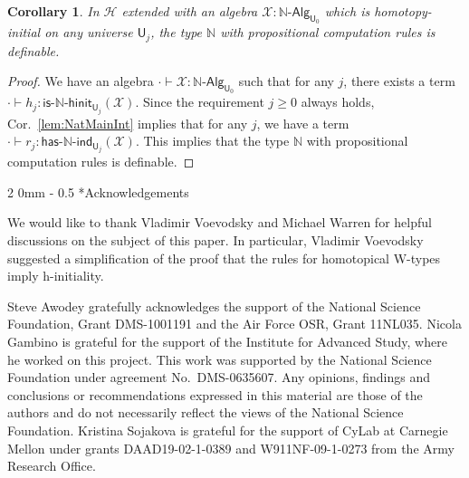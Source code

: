 \documentclass[reqno,10pt,a4paper,oneside]{amsart}
\makeatletter
\numberwithin{equation}{section}
\renewcommand{\subsection}{\@startsection
  {subsection}%
  {2}%
  {0mm}%
  {-\baselineskip}%
  {0.5\baselineskip}%
  {\normalfont\normalsize\bf}}%
\theoremstyle{mythm}
\newtheorem{corollary}[theorem]{Corollary}
\theoremstyle{mydef}
\theoremstyle{myrmk}
\newcommand{\Hint}{\mathcal{H}}
\newcommand{\nat}{\ensuremath{\mathbb{N}}}
\newcommand{\UU}{\mathsf{U}}
\newcommand{\NatAlg}{\nat\text{-}\mathsf{Alg}}
\newcommand{\HasNatInd}{\mathsf{has}\text{-}\nat\text{-}\mathsf{ind}}
\newcommand{\IsNatHInit}{\mathsf{is}\text{-}\nat\text{-}\mathsf{hinit}}
\newcommand{\X}{\mathcal{X}}
\makeatother
\begin{document}
\begin{corollary}\label{lem:NatCharInt}
In $\Hint$ extended with an algebra $\X : \NatAlg_{\UU_0}$ which is homotopy-initial on any universe $\UU_j$, the type $\nat$ with propositional computation rules is definable. 
\end{corollary}
\begin{proof}
We have an algebra $\cdot \vdash \X : \NatAlg_{\UU_0}$ such that for any $j$, there exists a term $\cdot \vdash h_j  : \IsNatHInit_{\UU_j}(\X)$. Since the requirement $j \geq 0$ always holds, Cor.~\ref{lem:NatMainInt} implies that for any $j$, we have a term $\cdot \vdash r_j : \HasNatInd_{\UU_j}(\X)$. This implies that the type $\nat$ with propositional computation rules is definable.
\end{proof}






\subsection*{Acknowledgements}

We would like to thank Vladimir Voevodsky and Michael Warren for helpful discussions
on the subject of this paper. In particular, Vladimir Voevodsky suggested a simplification of the 
proof that the rules for homotopical W-types imply h-initiality.

Steve Awodey gratefully acknowledges the support of the National Science Foundation, Grant DMS-1001191
 and the Air Force OSR, Grant 11NL035.
Nicola Gambino is grateful for the support of the Institute for Advanced Study, where
he worked on this project. This work was supported by the National Science Foundation 
under agreement No.\ DMS-0635607. Any opinions, findings and conclusions or recommendations
expressed in this material are those of the authors and do not necessarily reflect the views of
the National Science Foundation.
Kristina Sojakova is grateful for the support of CyLab at Carnegie
Mellon under grants DAAD19-02-1-0389 and W911NF-09-1-0273 from the Army
Research Office.






                        
\end{document}
